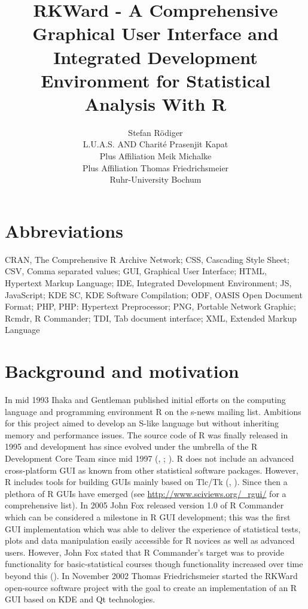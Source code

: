 \documentclass[article,shortnames]{jss}
\author{Stefan R\"odiger\\L.U.A.S. AND Charit\'e
	\And Prasenjit Kapat\\Plus Affiliation
	\And Meik Michalke\\Plus Affiliation
	\And Thomas Friedrichsmeier\\Ruhr-University Bochum}
\title{RKWard - A Comprehensive Graphical User Interface and Integrated Development Environment for Statistical Analysis With {R}}
\begin{document}

\section[Abbreviations]{Abbreviations}
CRAN, The Comprehensive R Archive Network; CSS, Cascading Style Sheet;
CSV, Comma separated values; GUI, Graphical User Interface; HTML,
Hypertext Markup Language; IDE, Integrated Development Environment; JS,
JavaScript; KDE SC, KDE Software Compilation; ODF, OASIS Open Document
Format; PHP, PHP: Hypertext Preprocessor; PNG, Portable Network
Graphic; Rcmdr, R Commander; TDI, Tab document interface; XML, Extended
Markup Language

\section[Background and motivation]{Background and motivation}
In mid 1993 Ihaka and Gentleman published initial efforts on the computing
language and programming environment R on the s-news mailing list. Ambitions for
this project aimed to develop an S-like language but without inheriting memory
and performance issues. The source code of R was finally released in 1995 and
development has since evolved under the umbrella of the R Development Core Team
since mid 1997 (\cite {RDCT2001}, \cite{RDCT2010}; \cite{Ihaka_Gentlemen_1993}).
R does not include an advanced cross-platform GUI as known from other
statistical software packages. However, R includes tools for building GUIs
mainly based on Tlc/Tk (\cite{Dalgaard2001}, \cite{Dalgaard2002}). Since then a
plethora of R GUIs have emerged (see \url{http://www.sciviews.org/_rgui/} for a
comprehensive list). In 2005 John Fox released version 1.0 of R Commander which
can be considered a milestone in R GUI development; this was the first GUI
implementation which was able to deliver the experience of statistical tests,
plots and data manipulation easily accessible for R novices as well as advanced
users. However, John Fox stated that R Commander's target was to provide
functionality for basic-statistical courses though functionality increased over
time beyond this (\cite{Fox2005}). In November 2002 Thomas Friedrichsmeier
started the RKWard open-source software project with the goal to create an
implementation of an R GUI based on KDE and Qt technologies.
\end{document}
